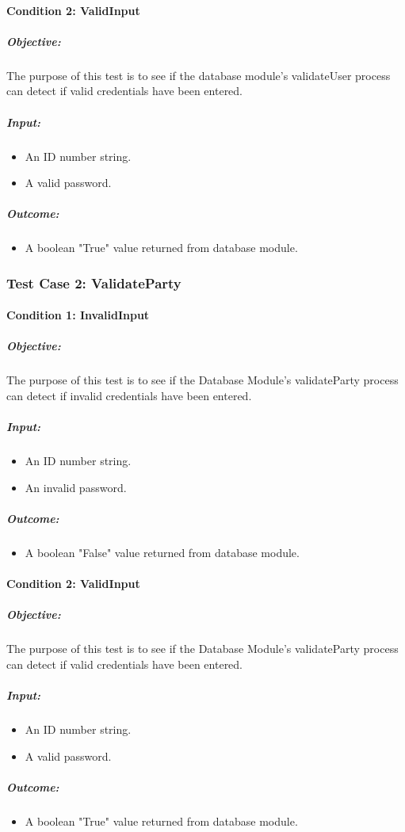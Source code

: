 \documentclass[11pt]{article}
\begin{document}
		\paragraph{Condition 2: ValidInput}	
		\subparagraph{Objective:}
		The purpose of this test is to see if the database module's validateUser process can detect if valid credentials have been entered.
		\subparagraph{Input:}
		\begin{itemize}
			\item An ID number string.
			\item A valid password.
		\end{itemize}
		\subparagraph{Outcome:}
		\begin{itemize}
			\item A boolean "True" value returned from database module.
		\end{itemize}
		
		\subsubsection{Test Case 2: ValidateParty}
		\paragraph{Condition 1: InvalidInput}	
		\subparagraph{Objective:}
		The purpose of this test is to see if the Database Module's validateParty process can detect if invalid credentials have been entered.
		\subparagraph{Input:}
		\begin{itemize}
			\item An ID number string.
			\item An invalid password.
		\end{itemize}
		\subparagraph{Outcome:}
		\begin{itemize}
			\item A boolean "False" value returned from database module.
		\end{itemize}
		
		\paragraph{Condition 2: ValidInput}	
		\subparagraph{Objective:}
		The purpose of this test is to see if the Database Module's validateParty process can detect if valid credentials have been entered.
		\subparagraph{Input:}
		\begin{itemize}
			\item An ID number string.
			\item A valid password.
		\end{itemize}
		\subparagraph{Outcome:}
		\begin{itemize}
			\item A boolean "True" value returned from database module.
		\end{itemize}
	
\end{document}
